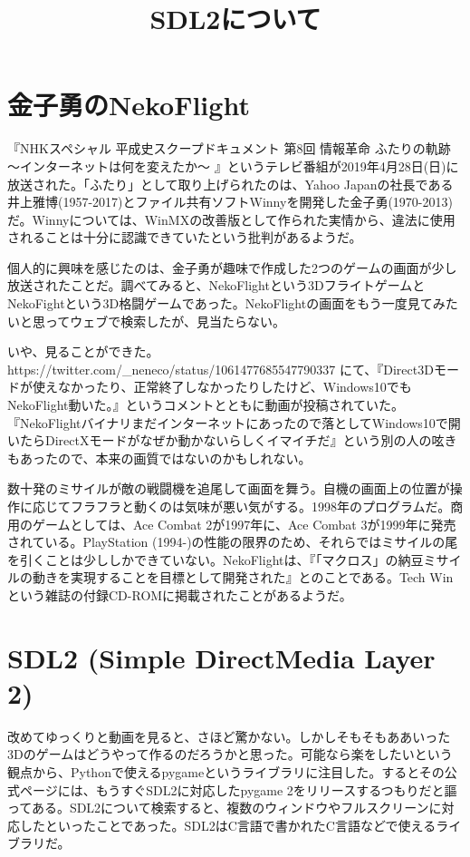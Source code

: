 \documentclass[uplatex,dvipdfmx]{jsarticle} \usepackage{amsmath,amssymb,bm}
\title{SDL2について} \author{} \date{}
\begin{document}
\maketitle


\section*{金子勇のNekoFlight}
『NHKスペシャル 平成史スクープドキュメント 第8回 情報革命 ふたりの軌跡 ～インターネットは何を変えたか～ 』というテレビ番組が2019年4月28日(日)に放送された。「ふたり」として取り上げられたのは、Yahoo Japanの社長である井上雅博(1957-2017)とファイル共有ソフトWinnyを開発した金子勇(1970-2013)だ。Winnyについては、WinMXの改善版として作られた実情から、違法に使用されることは十分に認識できていたという批判があるようだ。

個人的に興味を感じたのは、金子勇が趣味で作成した2つのゲームの画面が少し放送されたことだ。調べてみると、NekoFlightという3DフライトゲームとNekoFightという3D格闘ゲームであった。NekoFlightの画面をもう一度見てみたいと思ってウェブで検索したが、見当たらない。

いや、見ることができた。https://twitter.com/\_neneco/status/1061477685547790337 にて、『Direct3Dモードが使えなかったり、正常終了しなかったりしたけど、Windows10でもNekoFlight動いた。』というコメントとともに動画が投稿されていた。『NekoFlightバイナリまだインターネットにあったので落としてWindows10で開いたらDirectXモードがなぜか動かないらしくイマイチだ』という別の人の呟きもあったので、本来の画質ではないのかもしれない。

数十発のミサイルが敵の戦闘機を追尾して画面を舞う。自機の画面上の位置が操作に応じてフラフラと動くのは気味が悪い気がする。1998年のプログラムだ。商用のゲームとしては、Ace Combat 2が1997年に、Ace Combat 3が1999年に発売されている。PlayStation (1994-)の性能の限界のため、それらではミサイルの尾を引くことは少ししかできていない。NekoFlightは、『「マクロス」の納豆ミサイルの動きを実現することを目標として開発された』とのことである。Tech Winという雑誌の付録CD-ROMに掲載されたことがあるようだ。



\section*{SDL2 (Simple DirectMedia Layer 2)}
改めてゆっくりと動画を見ると、さほど驚かない。しかしそもそもああいった3Dのゲームはどうやって作るのだろうかと思った。可能なら楽をしたいという観点から、Pythonで使えるpygameというライブラリに注目した。するとその公式ページには、もうすぐSDL2に対応したpygame 2をリリースするつもりだと謳ってある。SDL2について検索すると、複数のウィンドウやフルスクリーンに対応したといったことであった。SDL2はC言語で書かれたC言語などで使えるライブラリだ。
\end{document}

